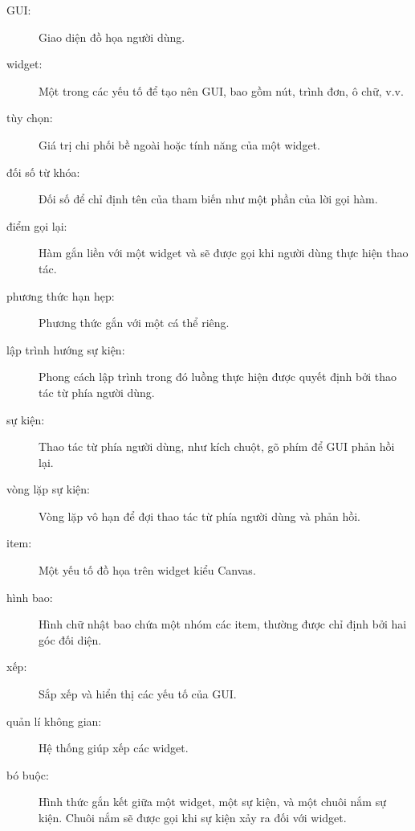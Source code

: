 \documentclass[11pt]{book}
\begin{document}
\begin{description}

\item[GUI:] Giao diện đồ họa người dùng.

\item[widget:] Một trong các yếu tố để tạo nên GUI, bao gồm
nút, trình đơn, ô chữ, v.v.

\item[tùy chọn:] Giá trị chi phối bề ngoài hoặc tính năng của
một widget.

\item[đối số từ khóa:] Đối số để chỉ định tên của tham biến
như một phần của lời gọi hàm.

\item[điểm gọi lại:] Hàm gắn liền với một widget và sẽ được gọi
khi người dùng thực hiện thao tác.

\item[phương thức hạn hẹp:] Phương thức gắn với một cá thể riêng.

\item[lập trình hướng sự kiện:] Phong cách lập trình trong đó
luồng thực hiện được quyết định bởi thao tác từ phía người dùng.

\item[sự kiện:] Thao tác từ phía người dùng, như kích chuột, gõ phím
để GUI phản hồi lại.

\item[vòng lặp sự kiện:] Vòng lặp vô hạn để đợi thao tác từ phía người dùng
và phản hồi.

\item[item:] Một yếu tố đồ họa trên widget kiểu Canvas.

\item[hình bao:] Hình chữ nhật bao chứa một nhóm các item,
thường được chỉ định bởi hai góc đối diện.

\item[xếp:] Sắp xếp và hiển thị các yếu tố của GUI.

\item[quản lí không gian:] Hệ thống giúp xếp các widget.

\item[bó buộc:] Hình thức gắn kết giữa một widget, một sự kiện, và
một chuôi nắm sự kiện. Chuôi nắm sẽ được gọi khi sự kiện xảy ra
đối với widget.

\end{description}
\end{document}

